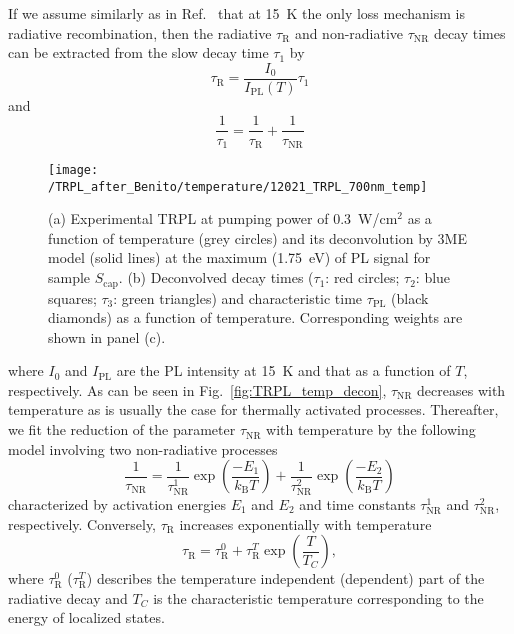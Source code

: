 If we assume similarly as in Ref.~\citep{t_alvarez} that at 15~K the only loss mechanism is radiative recombination, then the radiative $\tau_\mathrm{R}$ and non-radiative $\tau_\mathrm{NR}$ decay times can be extracted from the slow decay time $\tau_1$ by
%
\begin{equation}
\tau_\mathrm{R}=\frac{I_0}{I_\mathrm{PL}(T)}\tau_1 \label{eq:tau_R_fromtau1}
\end{equation}
and
\begin{equation}
\frac{1}{\tau_1}=\frac{1}{\tau_\mathrm{R}} + \frac{1}{\tau_\mathrm{NR}}
\end{equation}
%
\begin{figure}
	\centering
	\texttt{[image: /TRPL\_after\_Benito/temperature/12021\_TRPL\_700nm\_temp]}
	\caption{(a) Experimental TRPL at pumping power of 0.3~W/cm$^2$ as a function of temperature (grey circles) and its deconvolution by 3ME model (solid lines) at the maximum (1.75~eV) of PL signal for sample $S_\mathrm{cap}$. (b) Deconvolved decay times ($\tau_1$: red circles; $\tau_2$: blue squares; $\tau_3$: green triangles) and characteristic time $\tau_\mathrm{PL}$ (black diamonds) as a function of temperature. Corresponding weights are shown in panel (c).}
	\label{fig:TRPL_temp_c}
\end{figure}
%

\noindent where $I_0$ and $I_\mathrm{PL}$ are the PL intensity at 15~K and that as a function of $T$, respectively. As can be seen in Fig.~\ref{fig:TRPL_temp_decon}, $\tau_\mathrm{NR}$ decreases with temperature as is usually the case for thermally activated processes. Thereafter, we fit the reduction of the parameter $\tau_\mathrm{NR}$ with temperature by the following model involving two non-radiative processes 
%
\begin{equation}
\frac{1}{\tau_\mathrm{NR}}=\frac{1}{\tau_\mathrm{NR}^1}\exp{\left(\frac{-E_1}{k_\mathrm{B}T}\right)} + \frac{1}{\tau_\mathrm{NR}^2}\exp{\left(\frac{-E_2}{k_\mathrm{B}T}\right)} \label{eq:nonradiative}
\end{equation}
characterized by activation energies $E_1$ and $E_2$ and time constants $\tau_\mathrm{NR}^1$ and $\tau_\mathrm{NR}^2$, respectively.
Conversely, $\tau_\mathrm{R}$ increases exponentially with temperature
%
\begin{equation}
\tau_\mathrm{R} = \tau_\mathrm{R}^0 + \tau_\mathrm{R}^T \exp{\left(\frac{T}{T_C}\right)}, \label{eq:tau_R} 
\end{equation}
where $ \tau_\mathrm{R}^0$ ($ \tau_\mathrm{R}^T$) describes the temperature independent (dependent) part of the radiative decay and $T_C$ is the characteristic temperature corresponding to the energy of localized states. 

